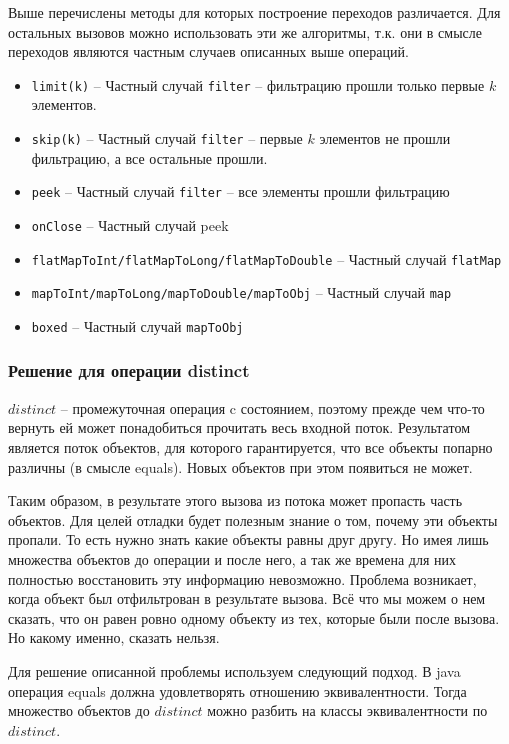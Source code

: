 Выше перечислены методы для которых построение переходов различается. Для остальных вызовов можно использовать эти же алгоритмы, т.к. они в смысле переходов являются частным случаев описанных выше операций.
\begin{itemize}
	\item \texttt{limit(k)} -- Частный случай \texttt{filter} -- фильтрацию прошли только первые $k$ элементов.
	\item \texttt{skip(k)} -- Частный случай \texttt{filter} -- первые $k$ элементов не прошли фильтрацию, а все остальные прошли.
	\item \texttt{peek} -- Частный случай \texttt{filter} -- все элементы прошли фильтрацию
	\item \texttt{onClose} -- Частный случай peek
	\item \texttt{flatMapToInt/flatMapToLong/flatMapToDouble} -- Частный случай \texttt{flatMap}
	\item \texttt{mapToInt/mapToLong/mapToDouble/mapToObj} -- Частный случай \texttt{map}
	\item \texttt{boxed} -- Частный случай \texttt{mapToObj}
\end{itemize}  


\subsubsection{Решение для операции distinct}
$distinct$ -- промежуточная операция c состоянием, поэтому прежде чем что-то вернуть ей может понадобиться прочитать весь входной поток. Результатом является поток объектов, для которого гарантируется, что все объекты попарно различны (в смысле equals\cite{java:equals}). Новых объектов при этом появиться не может.

Таким образом, в результате этого вызова из потока может пропасть часть объектов. Для целей отладки будет полезным знание о том, почему эти объекты пропали. То есть нужно знать какие объекты равны друг другу. Но имея лишь множества объектов до операции и после него, а так же времена для них полностью восстановить эту информацию невозможно. Проблема возникает, когда объект был отфильтрован в результате вызова. Всё что мы можем о нем сказать, что он равен ровно одному объекту из тех, которые были после вызова. Но какому именно, сказать нельзя.

Для решение описанной проблемы используем следующий подход. В java операция equals должна удовлетворять отношению эквивалентности. Тогда множество объектов до $distinct$ можно разбить на классы эквивалентности по $distinct$. 

